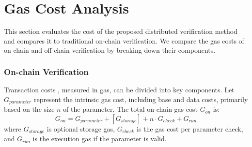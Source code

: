 \documentclass[runningheads]{llncs}
\begin{document}
\section{Gas Cost Analysis}
\label{sec:gas-cost-analysis}
This section evaluates the cost of the proposed distributed verification method and compares it to traditional on-chain verification.
We compare the gas costs of on-chain and off-chain verification by breaking down their components.

\subsubsection{On-chain Verification}
Transaction costs \cite{eth-yellowpaper,chen2019underoptimized,victor2019measuring}, measured in gas, can be divided into key components. Let \( G_{parameter} \) represent the intrinsic gas cost, including base and data costs, primarily based on the size \( n \) of the parameter. The total on-chain gas cost \( G_{on} \) is:
\begin{equation*}
\label{on-gas}
G_{on} = G_{parameter} + [G_{storage}] + n \cdot G_{check} + G_{run}
\end{equation*}
where \( G_{storage} \) is optional storage gas, \( G_{check} \) is the gas cost per parameter check, and \( G_{run} \) is the execution gas if the parameter is valid.
\end{document}
